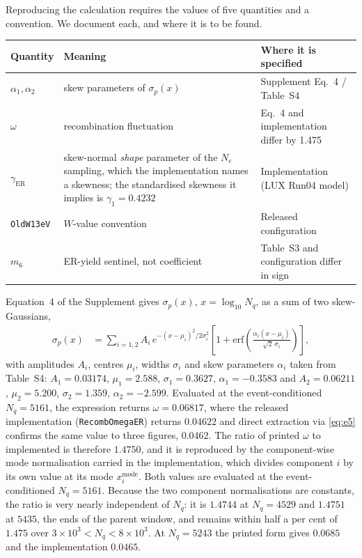 \documentclass[11pt,a4paper]{article}
\begin{document}
Reproducing the calculation requires the values of five quantities and a
convention. We document each, and where it is to be found. 
\begin{center}
\begin{tabular}{p{}p{}p{}}
\toprule
Quantity & Meaning & Where it is specified\\
\midrule
\(\alpha_1,\alpha_2\) & skew parameters of \(\sigma_p(x)\) & Supplement Eq.~4 / Table~S4\\
\(\omega\) & recombination fluctuation & Eq.~4 and implementation differ by 1.475\\
\(\gamma_\mathrm{ER}\) & skew-normal \emph{shape} parameter of the \(N_e\) sampling, which the implementation names a skewness; the standardised skewness it implies is \(\gamma_1=0.4232\) & Implementation (LUX Run04 model)\\
\texttt{OldW13eV} & \(W\)-value convention & Released configuration\\
\(m_6\) & ER-yield sentinel, not coefficient & Table~S3 and configuration differ in sign\\
\bottomrule
\end{tabular}
\end{center}

Equation~4 of the Supplement gives \(\sigma_p(x)\), \(x=\log_{10}N_q\), as a sum of two
skew-Gaussians,
\begin{align}
    \label{eq:sigmap}
    \sigma_p(x)\!&=\!\sum_{i=1,2}A_i\,
    e^{-(x-\mu_i)^2/2\sigma_i^2}
    \left[1+\mathrm{erf}\!\left(\frac{\alpha_i(x-\mu_i)}{\sqrt{2}\,\sigma_i}\right)\right],
\end{align}
with amplitudes \(A_i\), centres \(\mu_i\), widths \(\sigma_i\) and skew
parameters \(\alpha_i\) taken
from Table~S4: \(A_1=0.03174\), \(\mu_1=2.588\), \(\sigma_1=0.3627\),
\(\alpha_1=-0.3583\) and
\(A_2=0.06211\), \(\mu_2=5.200\), \(\sigma_2=1.359\),
\(\alpha_2=-2.599\).
Evaluated at the event-conditioned \(N_q=5161\), the expression returns
\(\omega=0.06817\), where the released implementation
(\texttt{RecombOmegaER}) returns \(0.04622\) and direct extraction via
\cref{eq:e5} confirms the same value to three figures, \(0.0462\). The
ratio of printed \(\omega\) to implemented is therefore \(1.4750\), and
it is reproduced by the component-wise
mode normalisation carried in the implementation, which divides
component \(i\) by its own value at its mode \(x_i^\mathrm{mode}\).
Both values are evaluated at the event-conditioned \(N_q=5161\). Because
the two component normalisations are constants, the ratio is very nearly
independent of \(N_q\): it is \(1.4744\) at \(N_q=4529\) and
\(1.4751\) at \(5435\), the ends of the parent window, and remains
within half a per cent of \(1.475\) over
\(3\times10^{3}<N_q<8\times10^{3}\). At \(N_q=5243\) the printed form
gives \(0.0685\) and the implementation \(0.0465\).
\end{document}
